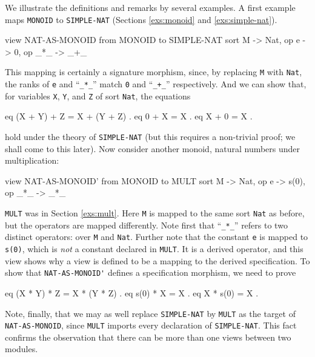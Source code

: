 \documentclass[a4paper]{memoir}
\begin{document}
We illustrate the definitions and remarks by several examples.
A first example maps \verb|MONOID| to \verb|SIMPLE-NAT|
(Sections \ref{exs:monoid} and \ref{exs:simple-nat}).
\begin{vvtm}
\begin{ccode}
  view NAT-AS-MONOID from MONOID to SIMPLE-NAT {
    sort M -> Nat,
    op e -> 0,
    op _*_ -> _+_
  }
\end{ccode}
\end{vvtm}
This mapping is certainly a signature morphism, since,
by replacing \verb|M| with \verb|Nat|, the ranks of
\verb|e| and ``\verb|_*_|'' match \verb|0| and ``\verb|_+_|'' respectively.
And we can show that, for variables \verb|X|, \verb|Y|, and \verb|Z|
of sort \verb|Nat|, the equations
\begin{vvtm}
\begin{ccode}
  eq (X + Y) + Z = X + (Y + Z) .
  eq 0 + X = X .
  eq X + 0 = X .
\end{ccode}
\end{vvtm}
hold under the theory of \verb|SIMPLE-NAT|
(but this requires a non-trivial proof; we shall come to this later).
Now consider another monoid, natural numbers under multiplication:
\begin{vvtm}
\begin{ccode}
  view NAT-AS-MONOID' from MONOID to MULT {
    sort M -> Nat,
    op e -> s(0),
    op _*_ -> _*_
  }
\end{ccode}
\end{vvtm}
\verb|MULT| was in Section \ref{exs:mult}. Here \verb|M| is mapped to
the same sort \verb|Nat| as before, but the operators are mapped
differently. Note first that ``\verb|_*_|'' refers to two distinct operators:
over \verb|M| and \verb|Nat|. Further note that the constant
\verb|e| is mapped to \verb|s(0)|, which is {\em not} a constant declared
in \verb|MULT|. It is a derived operator, and this view shows why
a view is defined to be a mapping to the derived specification.
To show that \verb|NAT-AS-MONOID'| defines a specification morphism, we
need to prove
\begin{vvtm}
\begin{ccode}
  eq (X * Y) * Z = X * (Y * Z) .
  eq s(0) * X = X .
  eq X * s(0) = X .
\end{ccode}
\end{vvtm}
Note, finally, that we may as well replace \verb|SIMPLE-NAT| by \verb|MULT|
as the target of \verb|NAT-AS-MONOID|, since \verb|MULT| imports every
declaration of \verb|SIMPLE-NAT|. This fact confirms the observation that
there can be more than one views between two modules.
\end{document}
